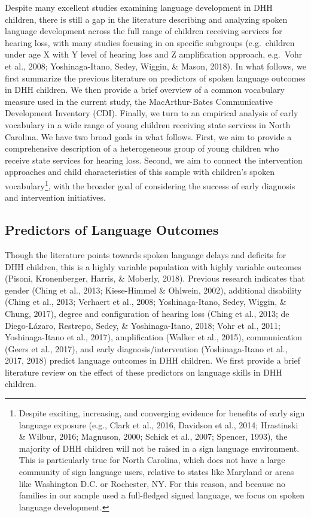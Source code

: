\documentclass[
  english,
  man]{apa6}
\begin{document}
Despite many excellent studies examining language development in DHH children, there is still a gap in the literature describing and analyzing spoken language development across the full range of children receiving services for hearing loss, with many studies focusing in on specific subgroups (e.g.~children under age X with Y level of hearing loss and Z amplification approach, e.g.~Vohr et al., 2008; Yoshinaga-Itano, Sedey, Wiggin, \& Mason, 2018). In what follows, we first summarize the previous literature on predictors of spoken language outcomes in DHH children. We then provide a brief overview of a common vocabulary measure used in the current study, the MacArthur-Bates Communicative Development Inventory (CDI). Finally, we turn to an empirical analysis of early vocabulary in a wide range of young children receiving state services in North Carolina. We have two broad goals in what follows. First, we aim to provide a comprehensive description of a heterogeneous group of young children who receive state services for hearing loss. Second, we aim to connect the intervention approaches and child characteristics of this sample with children's spoken vocabulary\footnote{Despite exciting, increasing, and converging evidence for benefits of early sign language exposure (e.g., Clark et al., 2016, Davidson et al., 2014; Hrastinski \& Wilbur, 2016; Magnuson, 2000; Schick et al., 2007; Spencer, 1993), the majority of DHH children will not be raised in a sign language environment. This is particularly true for North Carolina, which does not have a large community of sign language users, relative to states like Maryland or areas like Washington D.C. or Rochester, NY. For this reason, and because no families in our sample used a full-fledged signed language, we focus on spoken language development.}, with the broader goal of considering the success of early diagnosis and intervention initiatives.

\hypertarget{predictors-of-language-outcomes}{%
\subsection{Predictors of Language Outcomes}\label{predictors-of-language-outcomes}}

Though the literature points towards spoken language delays and deficits for DHH children, this is a highly variable population with highly variable outcomes (Pisoni, Kronenberger, Harris, \& Moberly, 2018). Previous research indicates that gender (Ching et al., 2013; Kiese-Himmel \& Ohlwein, 2002), additional disability (Ching et al., 2013; Verhaert et al., 2008; Yoshinaga-Itano, Sedey, Wiggin, \& Chung, 2017), degree and configuration of hearing loss (Ching et al., 2013; de Diego-Lázaro, Restrepo, Sedey, \& Yoshinaga-Itano, 2018; Vohr et al., 2011; Yoshinaga-Itano et al., 2017), amplification (Walker et al., 2015), communication (Geers et al., 2017), and early diagnosis/intervention (Yoshinaga-Itano et al., 2017, 2018) predict language outcomes in DHH children. We first provide a brief literature review on the effect of these predictors on language skills in DHH children.
\end{document}
